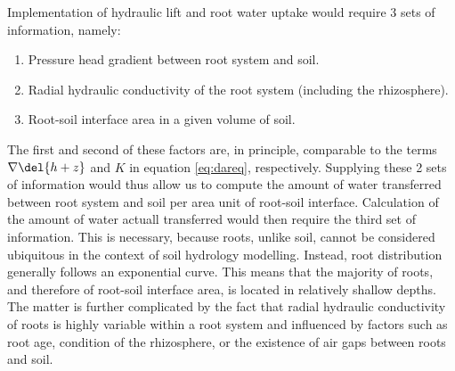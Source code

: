 Implementation of hydraulic lift and root water uptake would require 3 sets of information, namely:
\begin{enumerate}
\item Pressure head gradient between root system and soil.
\item Radial hydraulic conductivity of the root system (including the rhizosphere).
\item Root-soil interface area in a given volume of soil.
\end{enumerate}
The first and second of these factors are, in principle, comparable to the terms $\nabla \del{ h + z }$ and $K$ in equation \eqref{eq:dareq}, respectively. Supplying these 2 sets of information would thus allow us to compute the amount of water transferred between root system and soil per area unit of root-soil interface.  Calculation of the amount of water actuall transferred would then require the third set of information.  This is necessary, because roots, unlike soil, cannot be considered ubiquitous in the context of soil hydrology modelling.  Instead, root distribution generally follows an exponential curve.  This means that the majority of roots, and therefore of root-soil interface area, is located in relatively shallow depths.  The matter is further complicated by the fact that radial hydraulic conductivity of roots is highly variable within a root system and influenced by factors such as root age, condition of the rhizosphere, or the existence of air gaps between roots and soil.

